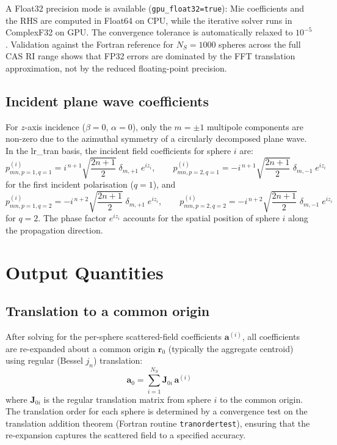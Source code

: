 \documentclass[11pt,a4paper]{article}
\begin{document}
A Float32 precision mode is available (\texttt{gpu\_float32=true}): Mie coefficients and the RHS are computed in Float64 on CPU, while the iterative solver runs in ComplexF32 on GPU.
The convergence tolerance is automatically relaxed to $10^{-5}$.
Validation against the Fortran reference for $N_S = 1000$ spheres across the full CAS RI range shows that FP32 errors are dominated by the FFT translation approximation, not by the reduced floating-point precision.

\subsection{Incident plane wave coefficients}

For $z$-axis incidence ($\beta = 0$, $\alpha = 0$), only the $m = \pm 1$ multipole components are non-zero due to the azimuthal symmetry of a circularly decomposed plane wave.
In the lr\_tran basis, the incident field coefficients for sphere $i$ are:
\begin{equation}
  p_{mn,p=1,q=1}^{(i)} = i^{\,n+1}\sqrt{\frac{2n+1}{2}}\;\delta_{m,+1}\;e^{iz_i}, \qquad
  p_{mn,p=2,q=1}^{(i)} = -i^{\,n+1}\sqrt{\frac{2n+1}{2}}\;\delta_{m,-1}\;e^{iz_i}
  \label{eq:pinc-q1}
\end{equation}
for the first incident polarisation ($q = 1$), and
\begin{equation}
  p_{mn,p=1,q=2}^{(i)} = -i^{\,n+2}\sqrt{\frac{2n+1}{2}}\;\delta_{m,+1}\;e^{iz_i}, \qquad
  p_{mn,p=2,q=2}^{(i)} = -i^{\,n+2}\sqrt{\frac{2n+1}{2}}\;\delta_{m,-1}\;e^{iz_i}
  \label{eq:pinc-q2}
\end{equation}
for $q = 2$.
The phase factor $e^{iz_i}$ accounts for the spatial position of sphere $i$ along the propagation direction.

\section{Output Quantities}
\label{sec:output}

\subsection{Translation to a common origin}

After solving for the per-sphere scattered-field coefficients $\bm{a}^{(i)}$, all coefficients are re-expanded about a common origin $\bm{r}_0$ (typically the aggregate centroid) using regular (Bessel $j_n$) translation:
\begin{equation}
  \bm{a}_0 = \sum_{i=1}^{N_S} \mathbf{J}_{0i}\,\bm{a}^{(i)}
  \label{eq:common-origin}
\end{equation}
where $\mathbf{J}_{0i}$ is the regular translation matrix from sphere $i$ to the common origin.
The translation order for each sphere is determined by a convergence test on the translation addition theorem (Fortran routine \texttt{tranordertest}), ensuring that the re-expansion captures the scattered field to a specified accuracy.
\end{document}
